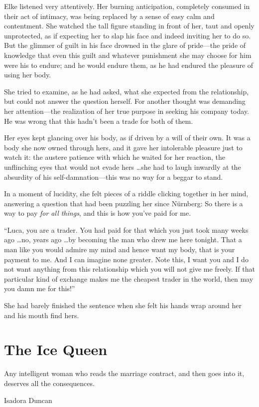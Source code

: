 Elke listened very attentively. Her burning anticipation, completely consumed in their act of intimacy, was being replaced by a sense of easy calm and contentment. She watched the tall figure standing in front of her, taut and openly unprotected, as if expecting her to slap his face and indeed inviting her to do so. But the glimmer of guilt in his face drowned in the glare of pride---the pride of knowledge that even this guilt and whatever punishment she may choose for him were his to endure; and he would endure them, as he had endured the pleasure of using her body.

She tried to examine, as he had asked, what she expected from the relationship, but could not answer the question herself. For another thought was demanding her attention---the realization of her true purpose in seeking his company today. He was wrong that this hadn't been a trade for both of them.

Her eyes kept glancing over his body, as if driven by a will of their own. It was a body she now owned through hers, and it gave her intolerable pleasure just to watch it: the austere patience with which he waited for her reaction, the unflinching eyes that would not evade hers \ldots she had to laugh inwardly at the absurdity of his self-damnation---this was no way for a beggar to stand.

In a moment of lucidity, she felt pieces of a riddle clicking together in her mind, answering a question that had been puzzling her since Nürnberg: So there is a way to pay \emph{for all things}, and this is how you've paid for me.

``Luca, you are a trader. You had paid for that which you just took many weeks ago \ldots no, years ago \ldots by becoming the man who drew me here tonight. That a man like you would admire my mind and hence want my body, that is your payment to me. And I can imagine none greater. Note this, I want you and I do not want anything from this relationship which you will not give me freely. If that particular kind of exchange makes me the cheapest trader in the world, then may you damn me for this!''

She had barely finished the sentence when she felt his hands wrap around her and his mouth find hers.

\chapter{The Ice Queen}

\epigraph{Any intelligent woman who reads the marriage contract, and then goes into it, deserves all the consequences.}{Isadora Duncan}

